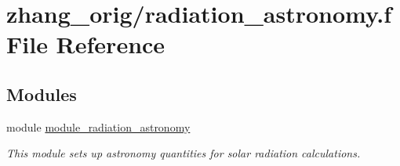 \hypertarget{zhang__orig_2radiation__astronomy_8f}{}\section{zhang\+\_\+orig/radiation\+\_\+astronomy.f File Reference}
\label{zhang__orig_2radiation__astronomy_8f}
\subsection*{Modules}
\begin{DoxyCompactItemize}
\item 
module \hyperlink{namespacemodule__radiation__astronomy}{module\+\_\+radiation\+\_\+astronomy}
\begin{DoxyCompactList}\small\item\em This module sets up astronomy quantities for solar radiation calculations. \end{DoxyCompactList}\end{DoxyCompactItemize}
